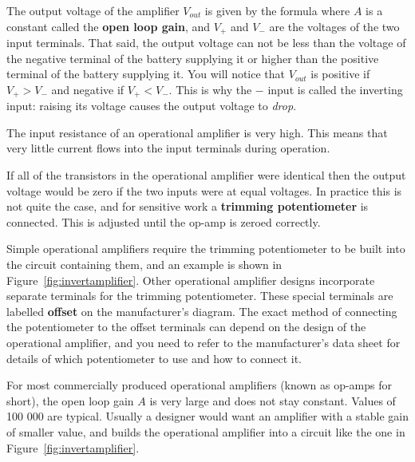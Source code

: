 The output voltage of the amplifier $V_{out}$ is given by the formula
where $A$ is a constant called the {\bf open loop gain}, and $V_{+}$ and $V_{-}$ are the voltages of the two input terminals.  That said, the output voltage can not be less than the voltage of the negative terminal of the battery supplying it or higher than the positive terminal of the battery supplying it.  You will notice that $V_{out}$ is positive if $V_{+} > V_{-}$ and negative if $V_{+} < V_{-}$.  This is why the $-$ input is called the inverting input: raising its voltage causes the output voltage to {\it drop}.

The input resistance of an operational amplifier is very high.  This means that very little current flows into the input terminals during operation.

If all of the transistors in the operational amplifier were identical then the output voltage would be zero if the two inputs were at equal voltages.  In practice this is not quite the case, and for sensitive work a {\bf trimming potentiometer} is connected.  This is adjusted until the op-amp is zeroed correctly.  

Simple operational amplifiers require the trimming potentiometer to be built into the circuit containing them, and an example is shown in Figure~\ref{fig:invertamplifier}.  Other operational amplifier designs incorporate separate terminals for the trimming potentiometer.  These special terminals are labelled {\bf offset} on the manufacturer's diagram.  The exact method of connecting the potentiometer to the offset terminals can depend on the design of the operational amplifier, and you need to refer to the manufacturer's data sheet for details of which potentiometer to use and how to connect it.

For most commercially produced operational amplifiers (known as op-amps for short), the open loop gain $A$ is very large and does not stay constant.  Values of 100 000 are typical.  Usually a designer would want an amplifier with a stable gain of smaller value, and builds the operational amplifier into a circuit like the one in Figure~\ref{fig:invertamplifier}.


